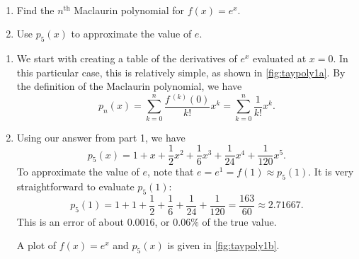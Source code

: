 \begin{example}\label{ex_taypoly1}
\mbox{}\\[-2\baselineskip]\begin{enumerate}
	\item	Find the $n^\text{th}$ Maclaurin polynomial for $f(x) = e^x$.
	\item	Use $p_5(x)$ to approximate the value of $e$.
\end{enumerate}
\solution
{}
\begin{enumerate}
\item We start with creating a table of the derivatives of $e^x$ evaluated at $x=0$. In this particular case, this is relatively simple, as shown in \autoref{fig:taypoly1a}. By the definition of the Maclaurin polynomial, we have 
\[
	p_n(x)
	=\sum_{k=0}^n\frac{f\,^{(k)}(0)}{k!}x^k
	=\sum_{k=0}^n\frac1{k!}x^k.
\]

\item	Using our answer from part 1, we have
\[p_5(x) = 1+x+\frac{1}{2}x^2+\frac{1}{6}x^3 + \frac{1}{24}x^4 + \frac{1}{120}x^5.\]
To approximate the value of $e$, note that $e = e^1 = f(1) \approx p_5(1).$ It is very straightforward to evaluate $p_5(1)$:
%
%
\[p_5(1) = 1+1+\frac12+\frac16+\frac1{24}+\frac1{120} = \frac{163}{60} \approx 2.71667.\]
This is an error of about $0.0016$, or $0.06\%$ of the true value.

A plot of $f(x)=e^x$ and $p_5(x)$ is given in \autoref{fig:taypoly1b}.
\end{enumerate}
\end{example}

